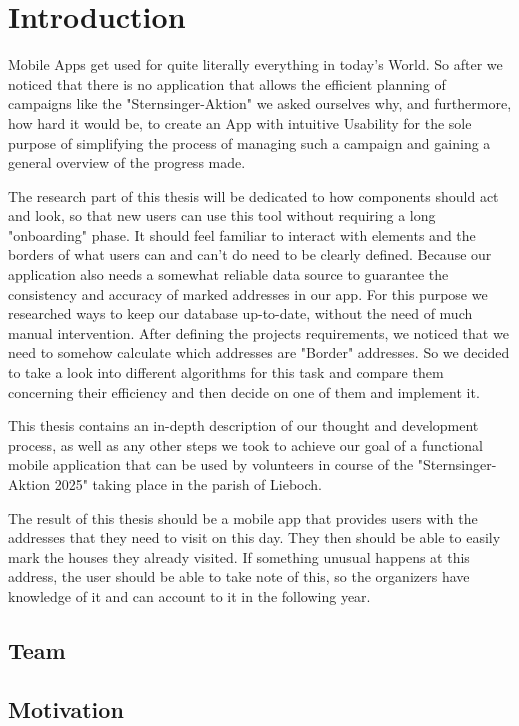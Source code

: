 \Author{\daAuthorTwo} 

\section{Introduction}


Mobile Apps get used for quite literally everything in today's World. So after
we noticed that there is no application that allows the efficient planning of
campaigns like the "Sternsinger-Aktion" we asked ourselves why, and furthermore,
how hard it would be, to create an App with intuitive Usability for the sole
purpose of simplifying the process of managing such a campaign and gaining a
general overview of the progress made. \newline

The research part of this thesis will be dedicated to how components should act
and look, so that new users can use this tool without requiring a long "onboarding" phase. It should feel familiar to interact with elements and the
borders of what users can and can't do need to be clearly defined. Because our
application also needs a somewhat reliable data source to guarantee the
consistency and accuracy of marked addresses in our app. For this purpose we
researched ways to keep our database up-to-date, without the need of much manual
intervention. After defining the projects requirements, we noticed that we need
to somehow calculate which addresses are "Border" addresses. So we decided to take a look into different algorithms for this task and compare them concerning their efficiency and then decide on one of them and implement it.
\newline

This thesis contains an in-depth description of our thought and development
process, as well as any other steps we took to achieve our goal of a
functional mobile application that can be used by volunteers in course of the
"Sternsinger-Aktion 2025" taking place in the parish of Lieboch. \newline

The result of this thesis should be a mobile app that provides users with the addresses that they need to visit on this day. They then should be able to easily mark the houses they already visited. If something unusual happens at this address, the user should be able to take note of this, so the organizers have knowledge of it and can account to it in the following year.

\subsection{Team}

\subsection{Motivation}

\newpage